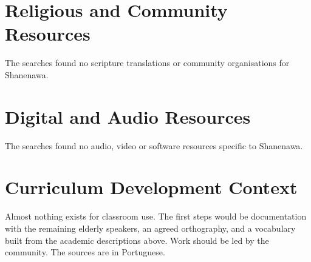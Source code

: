 \documentclass[12pt]{article}
\begin{document}
\section{Religious and Community Resources}
The searches found no scripture translations or community organisations for Shanenawa.

\section{Digital and Audio Resources}
The searches found no audio, video or software resources specific to Shanenawa.

\section{Curriculum Development Context}
Almost nothing exists for classroom use. The first steps would be documentation with the remaining elderly speakers, an agreed orthography, and a vocabulary built from the academic descriptions above. Work should be led by the community. The sources are in Portuguese.
\end{document}
